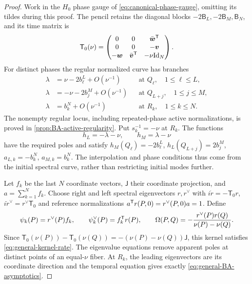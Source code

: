 \begin{proof}
Work in the $H_0$ phase gauge of \cref{eq:canonical-phase-gauge},
omitting its tildes during this proof. The pencil retains the diagonal
blocks $-2\mathsf B_L,-2\mathsf B_M,\mathsf B_N$, and its time matrix is
\begin{equation}\label{eq:multipoint-H0-time}
 \mathsf T_0(\nu)=
 \begin{pmatrix}0&0&\bar{\boldsymbol w}^{\mathsf T}\\
 0&0&-\boldsymbol v\\
 -\boldsymbol w&\bar{\boldsymbol v}^{\mathsf T}&-\nu\mathrm{Id}_N
 \end{pmatrix}.
\end{equation}
For distinct phases the regular normalized curve has branches
\begin{equation}\label{eq:BA-converse-infinity}
\begin{aligned}
 \lambda&=\nu-2b_{\ell}^L+O(\nu^{-1})&&\text{at }Q_{\ell},\quad1\leq\ell\leq L,\\
 \lambda&=-\nu-2b_j^M+O(\nu^{-1})&&\text{at }Q_{L+j},\quad1\leq j\leq M,\\
 \lambda&=b_k^N+O(\nu^{-1})&&\text{at }R_k,\quad1\leq k\leq N.
\end{aligned}
\end{equation}
The nonempty regular locus, including repeated-phase active
normalizations, is proved in \cref{prop:BA-active-regularity}.
Put $s_k^{-1}=-\nu$ at $R_k$. The functions
\begin{equation}\label{eq:BA-converse-h}
 h_L=-\lambda-\nu,\qquad h_M=\lambda-\nu
\end{equation}
have the required poles and satisfy
$h_M(Q_{\ell})=-2b_{\ell}^L$, $h_L(Q_{L+j})=2b_j^M$,
$a_{L,k}=-b_k^N$, $a_{M,k}=b_k^N$.
The interpolation and phase conditions thus come from the initial
spectral curve, rather than restricting initial modes further.

Let $f_k$ be the last $N$ coordinate vectors, $\mathsf J$ their
coordinate projection, and $a=\sum_{k=1}^{N}f_k$.
Choose right and left spectral eigenvectors $r,r^{\vee}$ with
$i\dot r=-\mathsf T_0r$, $i\dot r^{\vee}=r^{\vee}\mathsf T_0$ and reference
normalizations $a^{\mathsf T}r(P,0)=r^{\vee}(P,0)a=1$. Define
\begin{equation}\label{eq:BA-converse-functions}
 \psi_k(P)=r^{\vee}(P)f_k,\qquad
 \psi_k^\vee(P)=f_k^{\mathsf T}r(P),\qquad
 \Omega(P,Q)=-\frac{r^{\vee}(P)r(Q)}{\nu(P)-\nu(Q)}.
\end{equation}
Since $\mathsf T_0(\nu(P))-\mathsf T_0(\nu(Q))
=-(\nu(P)-\nu(Q))\mathsf J$, this kernel satisfies
\cref{eq:general-kernel-rate}. The eigenvalue equations remove apparent
poles at distinct points of an equal-$\nu$ fiber. At $R_k$, the leading
eigenvectors are its coordinate direction and the temporal equation
gives exactly \cref{eq:general-BA-asymptotics}.


\end{proof}
